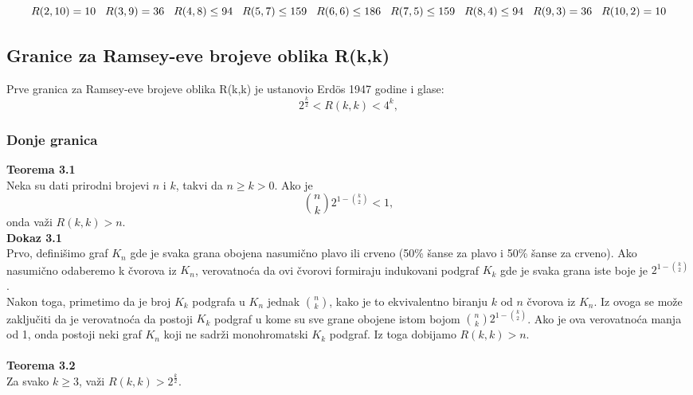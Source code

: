 \documentclass[12pt,a4paper]{article}
\begin{document}
\[R(2,10)=10\hspace{0.3cm}R(3,9)=36\hspace{0.3cm}R(4,8)\leq 94\hspace{0.3cm}R(5,7)\leq 159\hspace{0.3cm}R(6,6)\leq 186\hspace{0.3cm}R(7,5)\leq 159\hspace{0.3cm}R(8,4)\leq 94\hspace{0.3cm}R(9,3)=36\hspace{0.3cm}R(10,2)=10\]
\normalsize
\subsection{Granice za Ramsey-eve brojeve oblika R(k,k)}
Prve granica za Ramsey-eve brojeve oblika R(k,k) je ustanovio  Erd\"os 1947 godine i glase:
\[2^\frac{k}{2}<R(k,k)<4^k,\]

\subsubsection{Donje granica}
{\noindent\fontsize{12pt}{12pt}\textbf{Teorema 3.1}}\\
Neka su dati prirodni brojevi $n$ i $k$, takvi da $n\geq k>0$. Ako je
\[\binom{n}{k}2^{1-\binom{k}{2}}<1,\]
onda važi $R(k,k)>n$.\\

{\noindent\fontsize{12pt}{12pt}\textbf{Dokaz 3.1}} \\
Prvo, definišimo graf $K_n$ gde je svaka grana obojena nasumično plavo ili crveno (50\% šanse za plavo i 50\% šanse za crveno). Ako nasumično odaberemo k čvorova iz $K_n$, verovatnoća da ovi čvorovi formiraju indukovani podgraf $K_k$ gde je svaka grana iste boje je $2^{1-\binom{k}{2}}$.\\
Nakon toga, primetimo da je broj $K_k$ podgrafa u $K_n$ jednak $\binom{n}{k}$, kako je to ekvivalentno biranju $k$ od $n$ čvorova iz $K_n$. Iz ovoga se može zaključiti da je verovatnoća da postoji $K_k$ podgraf u kome su sve grane obojene istom bojom $\binom{n}{k}2^{1-\binom{k}{2}}$. Ako je ova verovatnoća manja od 1, onda postoji neki graf $K_n$ koji ne sadrži monohromatski $K_k$ podgraf. Iz toga dobijamo $R(k,k)>n$. \\ \\

{\noindent\fontsize{12pt}{12pt}\textbf{Teorema 3.2}} \\
Za svako $k\geq 3$, važi $R(k,k)>2^{\frac{k}{2}}$. \\
\end{document}
